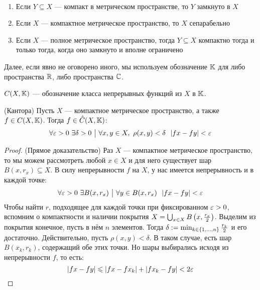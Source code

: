 \begin{exercise}~
	\begin{enumerate}
		\item Если $Y \subseteq X$ --- компакт в метрическом пространстве, то $Y$ замкнуто в $X$
		
		\item Если $X$ --- компактное метрическое пространство, то $X$ сепарабельно
		
		\item Если $X$ --- полное метрическое пространство, тогда $Y \subseteq X$ компактно тогда и только тогда, когда оно замкнуто и вполне ограничено
	\end{enumerate}
\end{exercise}

\begin{note}
	Далее, если явно не оговорено иного, мы используем обозначение $\mathbb{K}$ для либо пространства $\mathbb{R}$, либо пространства $\mathbb{C}$.
\end{note}

\begin{note}
	$C(X, \mathbb{K})$ --- обозначение класса непрерывных функций из $X$ в $\mathbb{K}$.
\end{note}

\begin{theorem} (Кантора)
	Пусть $X$ --- компактное метрическое пространство, а также $f \in C(X, \mathbb{K})$. Тогда $f \in \hat{C}(X, \mathbb{K})$:
	\[
		\forall \varepsilon > 0\ \exists \delta > 0 \ \big|\  \forall x, y \in X,\ \rho(x, y) < \delta\ \ |fx - fy| < \varepsilon
	\]
\end{theorem}

\begin{proof} (Прямое доказательство)
	Раз $X$ --- компактное метрическое пространство, то мы можем рассмотреть любой $x \in X$ и для него существует шар $B(x, r_x) \subseteq X$. В силу непрерывности $f$ на $X$, у нас имеется непрерывность и в каждой точке:
	\[
		\forall \varepsilon > 0\ \exists B(x, r_x) \ \big|\  \forall y \in B(x, r_x)\ \ |fx - fy| < \varepsilon
	\]
	Чтобы найти $r$, подходящее для каждой точки при фиксированном $\varepsilon > 0$, вспомним о компактности и наличии покрытия $X = \bigcup_{x \in X} B\left(x, \frac{r_x}{2}\right)$. Выделим из покрытия конечное, пусть в нём $n$ элементов. Тогда $\delta := \min_{k \in \{1, \ldots, n\}} \frac{r_k}{2}$ и его достаточно. Действительно, пусть $\rho(x, y) < \delta$. В таком случае, есть шар $B(x_k, r_k)$, содержащий обе этих точки. Но шары выбирались исходя из непрерывности $f$, то есть:
	\[
		|fx - fy| \leqslant |fx - fx_k| + |fx_k - fy| < 2\varepsilon
	\]
\end{proof}

